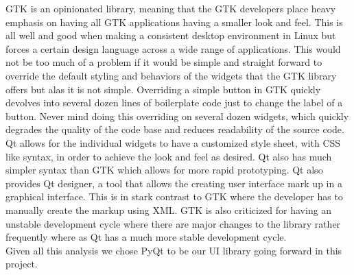 GTK is an opinionated library, meaning that the GTK developers place heavy emphasis on having all GTK applications having a smaller look and feel. This is all well and good when making a consistent desktop environment in Linux but forces a certain design language across a wide range of applications. This would not be too much of a problem if it would be simple and straight forward to override the default styling and behaviors of the widgets that the GTK library offers but alas it is not simple. Overriding a simple button in GTK quickly devolves into several dozen lines of boilerplate code just to change the label of a button. Never mind doing this overriding on several dozen widgets, which quickly degrades the quality of the code base and reduces readability of the source code.\\
Qt allows for the individual widgets to have a customized style sheet, with CSS like syntax, in order to achieve the look and feel as desired. Qt also has much simpler syntax than GTK which allows for more rapid prototyping. Qt also provides Qt designer, a tool that allows the creating user interface mark up in a graphical interface. This is in stark contrast to GTK where the developer has to manually create the markup using XML. GTK is also criticized for having an unstable development cycle where there are major changes to the library rather frequently where as Qt has a much more stable development cycle.\\
Given all this analysis we chose PyQt to be our UI library going forward in this project.
